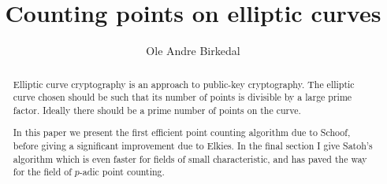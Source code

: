 \documentclass[a4paper,11pt,latin1]{amsart}
\title{Counting points on elliptic curves}
\author{Ole Andre Birkedal}
\begin{document}
\newtheorem{thm}{Theorem}
\newtheorem{mydef}{Definition}
\newtheorem{ex}{Example}
\newtheorem{prop}{Proposition}
\newtheorem{lemma}{Lemma}
\newtheorem{cor}{Corollary}

\begin{abstract}
Elliptic curve cryptography is an approach to public-key cryptography.
The elliptic curve chosen should be such that its number of points is divisible by
a large prime factor. Ideally there should be a prime number of points on the curve.

In this paper we present the first efficient point counting algorithm due to Schoof,
before giving a significant improvement due to Elkies. In the final section I give Satoh's
algorithm which is even faster for fields of small
characteristic, and has paved the way for the field of $p$-adic point counting.
\end{abstract}

\maketitle

\tableofcontents











\nocite{*}
\end{document}
